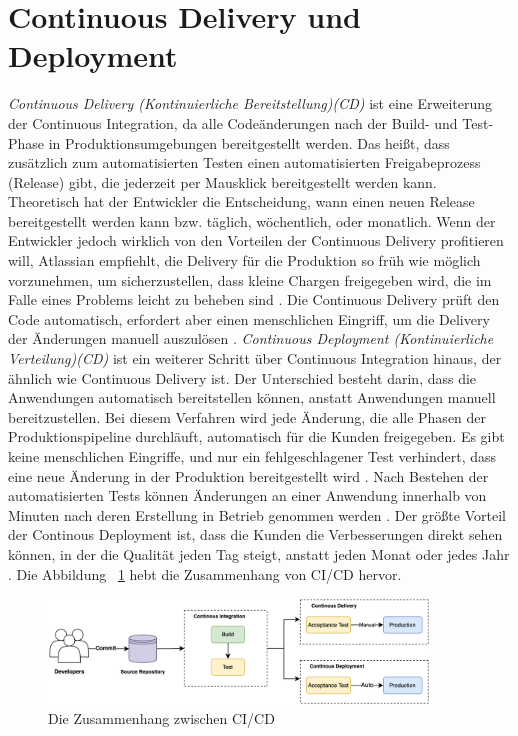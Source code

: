 \section{Continuous Delivery und Deployment}

\textit{Continuous Delivery (Kontinuierliche Bereitstellung)(CD)} ist eine Erweiterung der Continuous Integration, da alle Codeänderungen nach der Build- und Test-Phase in Produktionsumgebungen bereitgestellt werden. Das heißt, dass zusätzlich zum automatisierten Testen einen automatisierten Freigabeprozess (Release) gibt, die jederzeit per Mausklick bereitgestellt werden kann. Theoretisch hat der Entwickler die Entscheidung, wann einen neuen Release bereitgestellt werden kann bzw. täglich, wöchentlich, oder monatlich. Wenn der Entwickler jedoch wirklich von den Vorteilen der Continuous Delivery profitieren will, Atlassian empfiehlt, die Delivery für die Produktion so früh wie möglich vorzunehmen, um sicherzustellen, dass kleine Chargen freigegeben wird, die im Falle eines Problems leicht zu beheben sind \cite{Atlassian}. Die Continuous Delivery prüft den Code automatisch, erfordert aber einen menschlichen Eingriff, um die Delivery der Änderungen manuell auszulösen \cite{GitLab:CD}.
\newline \newline
\textit{Continuous Deployment (Kontinuierliche Verteilung)(CD)} ist ein weiterer Schritt über Continuous Integration hinaus, der ähnlich wie Continuous Delivery ist. Der Unterschied besteht darin, dass die Anwendungen automatisch bereitstellen können, anstatt Anwendungen manuell bereitzustellen. Bei diesem Verfahren wird jede Änderung, die alle Phasen der Produktionspipeline durchläuft, automatisch für die Kunden freigegeben. Es gibt keine menschlichen Eingriffe, und nur ein fehlgeschlagener Test verhindert, dass eine neue Änderung in der Produktion bereitgestellt wird \cite{Atlassian}. Nach Bestehen der automatisierten Tests können Änderungen an einer Anwendung innerhalb von Minuten nach deren Erstellung in Betrieb genommen werden \cite{GitLab:CD}. Der größte Vorteil der Continous Deployment ist, dass die Kunden die Verbesserungen direkt sehen können, in der die Qualität jeden Tag steigt, anstatt jeden Monat oder jedes Jahr \cite{Atlassian}. Die Abbildung ~\ref{fig:zusammenhandCICD} hebt die Zusammenhang von CI/CD hervor.

\begin{figure}[!htbp]%
	\centering
	\includegraphics[width=0.9\textwidth]{Graphics/The-relationship-between-CI_CD.png}
	\caption{Die Zusammenhang zwischen CI/CD \cite{Shahin2017}}
	\label{fig:zusammenhandCICD}
\end{figure}


